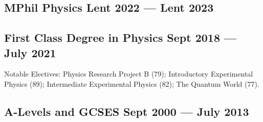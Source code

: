 \subsection{{MPhil Physics \hfill Lent 2022 --- Lent 2023}}
\begin{zitemize}
\vspace{7px}
\end{zitemize}
\subsection{{First Class Degree in Physics \hfill Sept 2018 --- July 2021}}

\begin{zitemize} 
\item Notable Electives: Physics Research Project B (79); Introductory Experimental Physics
(89); Intermediate Experimental Physics (82); The Quantum World (77).
\end{zitemize}

\subsection{{A-Levels and GCSES  \hfill Sept 2000 --- July 2013}}
\vspace{5px}

